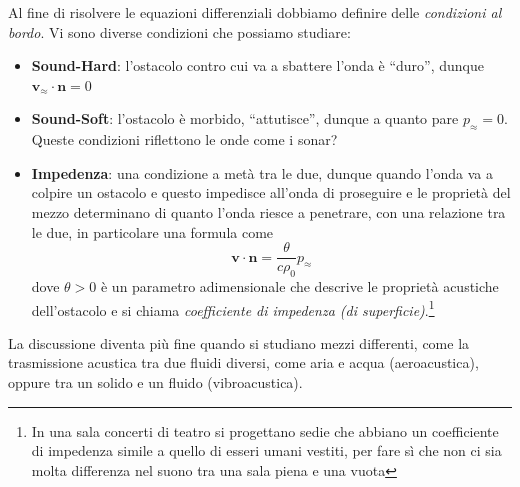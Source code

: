 Al fine di risolvere le equazioni differenziali dobbiamo definire delle
\emph{condizioni al bordo}. Vi sono diverse condizioni che possiamo studiare:
\begin{itemize}[label = --]
    \item \textbf{Sound-Hard}: l'ostacolo contro cui va a sbattere l'onda è
        ``duro'', dunque \(\mathbf{v}_\approx \cdot \mathbf{n} = 0\) 
    \item \textbf{Sound-Soft}: l'ostacolo è morbido, ``attutisce'', dunque a
        quanto pare \(p_\approx = 0\). Queste condizioni riflettono le onde come
        i sonar?
    \item \textbf{Impedenza}: una condizione a metà tra le due, dunque quando
        l'onda va a colpire un ostacolo e questo impedisce all'onda di
        proseguire e le proprietà del mezzo determinano di quanto l'onda riesce
        a penetrare, con una relazione tra le due, in particolare una formula
        come
        \[
          \mathbf{v} \cdot \mathbf{n} = \frac{\theta}{c\rho_{0}}p_\approx
        \]
        dove \(\theta > 0\) è un parametro adimensionale che descrive le proprietà
        acustiche dell'ostacolo e si chiama \emph{coefficiente di impedenza (di
        superficie)}.\footnote{In una sala concerti di teatro si progettano
            sedie che abbiano un coefficiente di impedenza simile a quello di
            esseri umani vestiti, per fare sì che non ci sia molta differenza
            nel suono tra una sala piena e una vuota}
\end{itemize}
La discussione diventa più fine quando si studiano mezzi differenti, come la
trasmissione acustica tra due fluidi diversi, come aria e acqua (aeroacustica),
oppure tra un solido e un fluido (vibroacustica).

